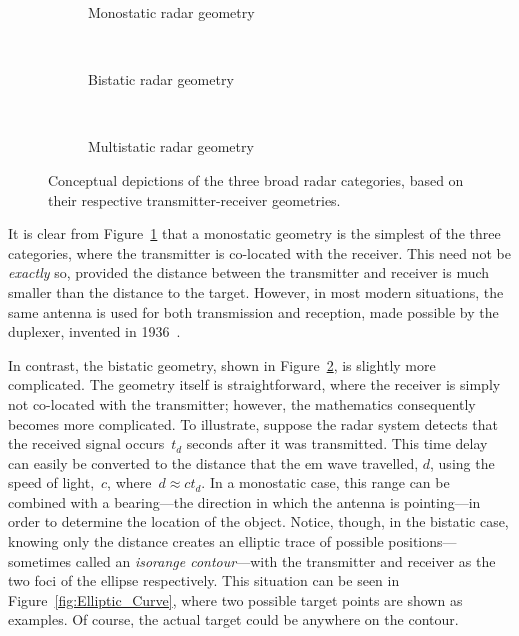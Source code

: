 \documentclass[class=report,11pt,crop=false]{standalone}
\begin{document}
\begin{figure}[htbp]
    \centering
    \captionsetup{type=figure}
    \begin{subfigure}[t]{0.48\textwidth}
        \centering
        \def\svgwidth{\linewidth}
        { %
            }
        \caption{Monostatic radar geometry}
        \label{fig:Geometry_Monostatic}
    \end{subfigure}%
    ~ 
    \begin{subfigure}[t]{0.48\textwidth}
        \centering
        \def\svgwidth{\linewidth}
        { %
            }
        \caption{Bistatic radar geometry}
        \label{fig:Geometry_Bistatic}
    \end{subfigure}
    ~
    \begin{subfigure}[t]{0.6\textwidth}
        \centering
        \def\svgwidth{\linewidth}
        { %
            }
        \caption{Multistatic radar geometry}
        \label{fig:Geometry_Multistatic}
    \end{subfigure}%
    \caption{Conceptual depictions of the three broad radar categories, based on their respective transmitter-receiver geometries.}
    \label{fig:Radar_Geometry_Depictions}
\end{figure}

It is clear from Figure~\ref{fig:Geometry_Monostatic} that a monostatic geometry is the simplest of the three categories, where the transmitter is co-located with the receiver. This need not be \emph{exactly} so, provided the distance between the transmitter and receiver is much smaller than the distance to the target. However, in most modern situations, the same antenna is used for both transmission and reception, made possible by the duplexer, invented in 1936~\cite{kuschel-hagan-history}.

In contrast, the bistatic geometry, shown in Figure~\ref{fig:Geometry_Bistatic}, is slightly more complicated. The geometry itself is straightforward, where the receiver is simply not co-located with the transmitter; however, the mathematics consequently becomes more complicated. To illustrate, suppose the radar system detects that the received signal occurs~\(t_d\) seconds after it was transmitted. This time delay can easily be converted to the distance that the \gls{em} wave travelled, \(d\), using the speed of light,~\(c\), where~\(d \approx ct_d\). In a monostatic case, this range can be combined with a bearing---the direction in which the antenna is pointing---in order to determine the location of the object. Notice, though, in the bistatic case, knowing only the distance creates an elliptic trace of possible positions---sometimes called an \emph{isorange contour}---with the transmitter and receiver as the two foci of the ellipse respectively. This situation can be seen in Figure~\ref{fig:Elliptic_Curve}, where two possible target points are shown as examples. Of course, the actual target could be anywhere on the contour.
\end{document}
